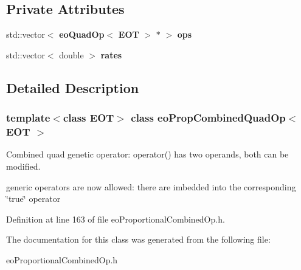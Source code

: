 \subsection*{Private Attributes}
\begin{CompactItemize}
\item 
std::vector$<$ {\bf eo\-Quad\-Op}$<$ {\bf EOT} $>$ $\ast$ $>$ {\bf ops}\label{classeo_prop_combined_quad_op_r0}

\item 
std::vector$<$ double $>$ {\bf rates}\label{classeo_prop_combined_quad_op_r1}

\end{CompactItemize}


\subsection{Detailed Description}
\subsubsection*{template$<$class EOT$>$ class eo\-Prop\-Combined\-Quad\-Op$<$ EOT $>$}

Combined quad genetic operator: operator() has two operands, both can be modified. 

generic operators are now allowed: there are imbedded into the corresponding \char`\"{}true\char`\"{} operator 



Definition at line 163 of file eo\-Proportional\-Combined\-Op.h.

The documentation for this class was generated from the following file:\begin{CompactItemize}
\item 
eo\-Proportional\-Combined\-Op.h\end{CompactItemize}
